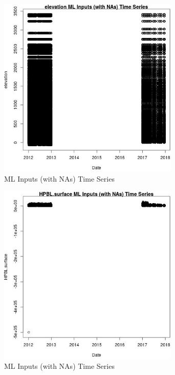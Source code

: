 \begin{figure} 
\centering  
\includegraphics[width=0.77\textwidth]{Code_Outputs/Report_ML_input_PM25_Step4_part_e_de_duplicated_aves_compiled_2019-05-14wNAs_elevationvDate.jpg} 
\caption{\label{fig:Report_ML_input_PM25_Step4_part_e_de_duplicated_aves_compiled_2019-05-14wNAselevationvDate}ML Inputs (with NAs) Time Series} 
\end{figure} 
 

\begin{figure} 
\centering  
\includegraphics[width=0.77\textwidth]{Code_Outputs/Report_ML_input_PM25_Step4_part_e_de_duplicated_aves_compiled_2019-05-14wNAs_HPBLsurfacevDate.jpg} 
\caption{\label{fig:Report_ML_input_PM25_Step4_part_e_de_duplicated_aves_compiled_2019-05-14wNAsHPBLsurfacevDate}ML Inputs (with NAs) Time Series} 
\end{figure} 
 

